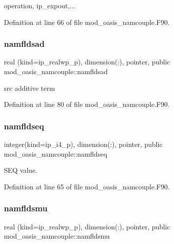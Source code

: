 operation, ip\+\_\+expout,... 



Definition at line 66 of file mod\+\_\+oasis\+\_\+namcouple.\+F90.

\mbox{\label{namespacemod__oasis__namcouple_a1729dba99742412a1e07a479cb7f7921}} 
\subsubsection{\texorpdfstring{namfldsad}{namfldsad}}
{\footnotesize\ttfamily real (kind=ip\+\_\+realwp\+\_\+p), dimension(\+:), pointer, public mod\+\_\+oasis\+\_\+namcouple\+::namfldsad}



src additive term 



Definition at line 80 of file mod\+\_\+oasis\+\_\+namcouple.\+F90.

\mbox{\label{namespacemod__oasis__namcouple_a54ccfe0380fc1c89d085f37a044a297e}} 
\subsubsection{\texorpdfstring{namfldseq}{namfldseq}}
{\footnotesize\ttfamily integer(kind=ip\+\_\+i4\+\_\+p), dimension(\+:), pointer, public mod\+\_\+oasis\+\_\+namcouple\+::namfldseq}



S\+EQ value. 



Definition at line 65 of file mod\+\_\+oasis\+\_\+namcouple.\+F90.

\mbox{\label{namespacemod__oasis__namcouple_ab52824ec91491253e02556a68ab31b09}} 
\subsubsection{\texorpdfstring{namfldsmu}{namfldsmu}}
{\footnotesize\ttfamily real (kind=ip\+\_\+realwp\+\_\+p), dimension(\+:), pointer, public mod\+\_\+oasis\+\_\+namcouple\+::namfldsmu}



